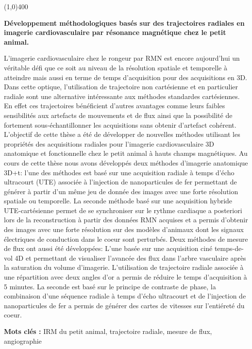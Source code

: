 \thispagestyle{empty}

  
\renewcommand{\baselinestretch}{1}
\line(1,0){400}  \\

\noindent
\small{\textbf{Développement méthodologiques basés sur des trajectoires radiales en imagerie cardiovasculaire par résonance magnétique chez le petit animal.}


L'imagerie cardiovasculaire chez le rongeur par RMN est encore aujourd'hui un véritable défi que ce soit au niveau de la résolution spatiale et temporelle à atteindre mais aussi en terme de temps d'acquisition pour des acquisitions en 3D.
Dans cette optique, l'utilisation de trajectoire non cartésienne et en particulier radiale sont une alternative intéressante aux méthodes standardes cartésiennes. En effet ces trajectoires bénéficient d'autres avantages comme leurs faibles sensibilités aux artefacts de mouvements et de flux ainsi que la possibilité de fortement sous-échantillonner les acquisitions sans obtenir d'artefact cohérent. L'objectif de cette thèse a été de développer de nouvelles méthodes utilisant les propriétés des acquisitions radiales pour l'imagerie cardiovasculaire 3D anatomique et fonctionnelle chez le petit animal à hauts champs magnétiques.
Au cours de cette thèse nous avons développés deux méthodes d'imagerie anatomique 3D+t: l'une des méthodes est basé sur une acquisition radiale à temps d'écho ultracourt (UTE) associée à l'injection de nanoparticules de fer permettant de générer à partir d'un même jeu de donnée des images avec une forte résolution spatiale ou temporelle. La seconde méthode basé sur une acquisition hybride UTE-cartésienne permet de se synchroniser sur le rythme cardiaque a posteriori lors de la reconstruction à partir des données RMN acquises et a permis d'obtenir des images avec une forte résolution sur des modèles d'animaux dont les signaux électriques de conduction dans le coeur sont perturbés.
Deux méthodes de mesure de flux ont aussi été développées: L'une basée sur une acquisition ciné temps-de-vol 4D et permettant de visualiser l'avancée des flux dans l'arbre vasculaire après la saturation du volume d'imagerie. L'utilisation de trajectoire radiale associée à une répartition avec deux angles d'or a permis de réduire le temps d'acquisition à 5 minutes. La seconde est basé sur le principe de contraste de phase, la combinaison d'une séquence radiale à temps d'écho ultracourt et de l'injection de nanoparticules de fer a permis de générer des cartes de vitesses sur l'entiéreté du coeur.

\noindent
\textbf{Mots clés : } IRM du petit animal, trajectoire radiale, mesure de flux, angiographie
}

